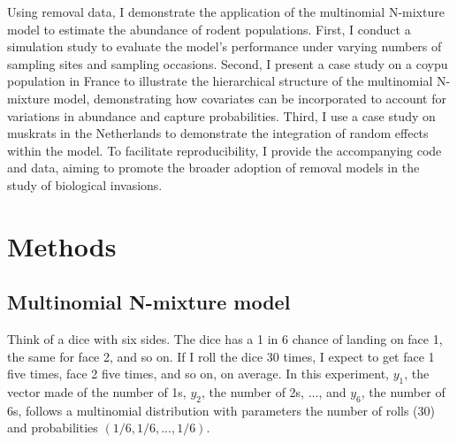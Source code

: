 \documentclass[
  11pt,
  a4paper,
]{article}
\begin{document}
Using removal data, I demonstrate the application of the multinomial N-mixture model to estimate the abundance of rodent populations. First, I conduct a simulation study to evaluate the model's performance under varying numbers of sampling sites and sampling occasions. Second, I present a case study on a coypu population in France to illustrate the hierarchical structure of the multinomial N-mixture model, demonstrating how covariates can be incorporated to account for variations in abundance and capture probabilities. Third, I use a case study on muskrats in the Netherlands to demonstrate the integration of random effects within the model. To facilitate reproducibility, I provide the accompanying code and data, aiming to promote the broader adoption of removal models in the study of biological invasions.

\section{Methods}\label{methods}

\subsection{Multinomial N-mixture model}\label{multinomial-n-mixture-model}

Think of a dice with six sides. The dice has a 1 in 6 chance of landing on face 1, the same for face 2, and so on. If I roll the dice 30 times, I expect to get face 1 five times, face 2 five times, and so on, on average. In this experiment, \(y_1\), the vector made of the number of 1s, \(y_2\), the number of 2s, \(\ldots\), and \(y_6\), the number of 6s, follows a multinomial distribution with parameters the number of rolls (30) and probabilities \((1/6, 1/6, ..., 1/6)\).
\end{document}
